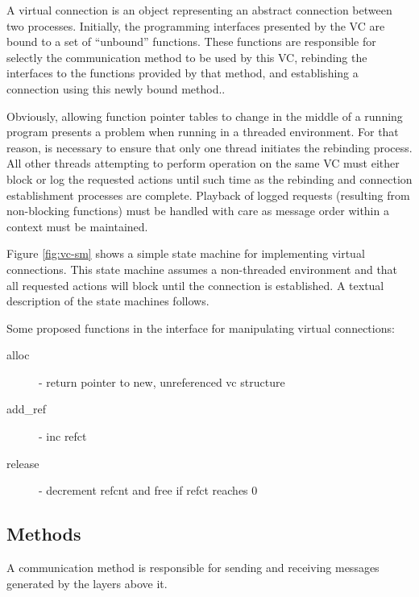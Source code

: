 \documentclass[11pt,letterpaper]{article}
\begin{document}
A virtual connection is an object representing an abstract connection between
two processes.  Initially, the programming interfaces presented by the VC are
bound to a set of ``unbound'' functions.  These functions are responsible for
selectly the communication method to be used by this VC, rebinding the
interfaces to the functions provided by that method, and establishing a
connection using this newly bound method..

Obviously, allowing function pointer tables to change in the middle of a
running program presents a problem when running in a threaded environment.  For
that reason, is necessary to ensure that only one thread initiates the
rebinding process.  All other threads attempting to perform operation on the
same VC must either block or log the requested actions until such time as the
rebinding and connection establishment processes are complete.  Playback of
logged requests (resulting from non-blocking functions) must be handled with
care as message order within a context must be maintained.

Figure \ref{fig:vc-sm} shows a simple state machine for implementing virtual
connections.  This state machine assumes a non-threaded environment and that
all requested actions will block until the connection is established.  A
textual description of the state machines follows.



Some proposed functions in the interface for manipulating virtual connections:
\begin{description}
\item[alloc] - return pointer to new, unreferenced vc structure
\item[add\_ref] - inc refct
\item[release] - decrement refcnt and free if refct reaches 0
\end{description}


\subsection{Methods}

A communication method is responsible for sending and receiving
messages generated by the layers above it.

\end{document}
